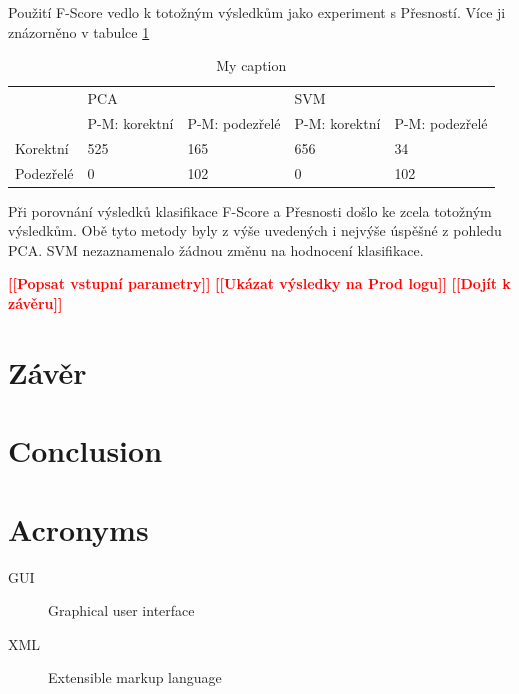 \documentclass[thesis=M,czech]{FITthesis}[2012/10/20]
\newcommand{\todo}[1]{\textcolor{red}{\textbf{[[#1]]}}}
\begin{document}
			Použití F-Score vedlo k totožným výsledkům jako experiment s Přesností. Více ji znázorněno v tabulce \ref{table:anomaly_f-score}
		
			\begin{table}[htb]\centering
				\centering
				\caption{My caption}
				\label{table:anomaly_f-score}
				\begin{tabular}{|l|l|l|l|l|}
					\hline
					\multirow{2}{*}{} & \multicolumn{2}{l|}{PCA}                 & \multicolumn{2}{l|}{SVM}                 \\ 
					& P-M: korektní & P-M: podezřelé & P-M: korektní & P-M: podezřelé \\ \hline
					Korektní          & 525                & 165                 & 656                & 34                  \\ \hline
					Podezřelé         & 0                  & 102                 & 0                  & 102                 \\ \hline
				\end{tabular}
			\end{table}
		
			Při porovnání výsledků klasifikace F-Score a Přesnosti došlo ke zcela totožným výsledkům. Obě tyto metody byly z výše uvedených i nejvýše úspěšné z pohledu PCA. SVM nezaznamenalo žádnou změnu na hodnocení klasifikace.
		
			
	
		\todo{Popsat vstupní parametry}
		\todo{Ukázat výsledky na Prod logu}	
		\todo{Dojít k závěru}						
	
\chapter{Závěr}

\chapter{Conclusion}





\appendix

\chapter{Acronyms}
\begin{description}
	\item[GUI] Graphical user interface
	\item[XML] Extensible markup language
\end{description}
\end{document}
